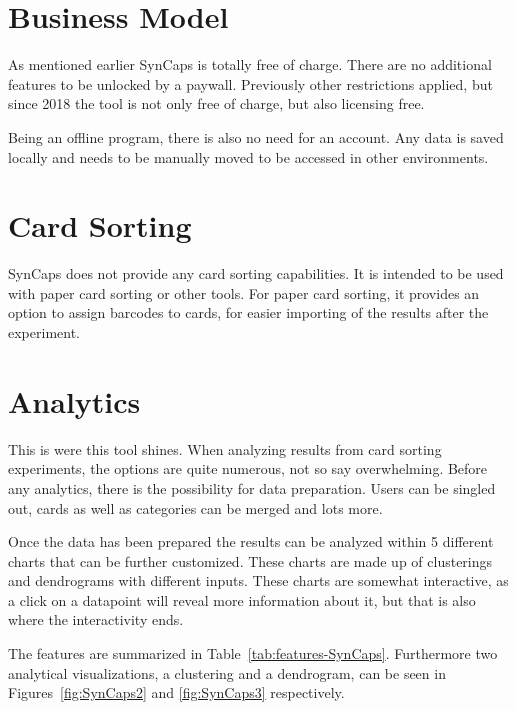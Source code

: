 \section{Business Model}
As mentioned earlier SynCaps is totally free of charge. There are no
additional features to be unlocked by a paywall. Previously other 
restrictions applied, but since 2018 the tool is not only free of
charge, but also licensing free.

Being an offline program, there is also no need for an account. Any 
data is saved locally and needs to be manually moved to be accessed in
other environments.

\section{Card Sorting}
SynCaps does not provide any card sorting capabilities. It is intended
to be used with paper card sorting or other tools. For paper card
sorting, it provides an option to assign barcodes to cards, for easier
importing of the results after the experiment.

\section{Analytics}
This is were this tool shines. When analyzing results from card
sorting experiments, the options are quite numerous, not so say
overwhelming. Before any analytics, there is the possibility for
data preparation. Users can be singled out, cards as well as categories
can be merged and lots more.

Once the data has been prepared the results can be analyzed within 5
different charts that can be further customized. These charts are made
up of clusterings and dendrograms with different inputs. These charts
are somewhat interactive, as a click on a datapoint will reveal more
information about it, but that is also where the interactivity ends.

The features are summarized in Table~\ref{tab:features-SynCaps}. Furthermore
two analytical visualizations, a clustering and a dendrogram, can be seen
in Figures~\ref{fig:SynCaps2} and \ref{fig:SynCaps3} respectively.

